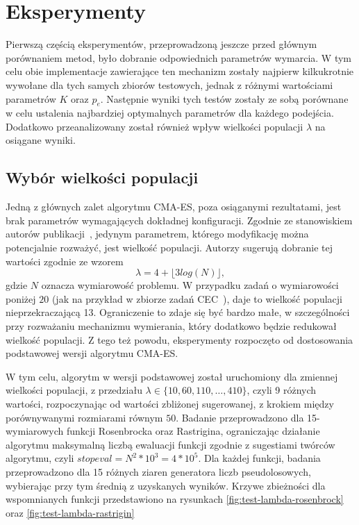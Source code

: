 \documentclass[10pt]{article}
\begin{document}
\section{Eksperymenty}
Pierwszą częścią eksperymentów, przeprowadzoną jeszcze przed głównym porównaniem metod, było dobranie odpowiednich parametrów wymarcia. W tym celu obie implementacje zawierające ten mechanizm zostały najpierw kilkukrotnie wywołane dla tych samych zbiorów testowych, jednak z różnymi wartościami parametrów $K$ oraz $p_e$. Następnie wyniki tych testów zostały ze sobą porównane w celu ustalenia najbardziej optymalnych parametrów dla każdego podejścia. Dodatkowo przeanalizowany został również wpływ wielkości populacji $\lambda$ na osiągane wyniki.

\subsection{Wybór wielkości populacji}
Jedną z głównych zalet algorytmu CMA-ES, poza osiąganymi rezultatami, jest brak parametrów wymagających dokładnej konfiguracji. Zgodnie ze stanowiskiem autorów publikacji~\cite{hansen2011}, jedynym parametrem, którego modyfikację można potencjalnie rozważyć, jest wielkość populacji. Autorzy sugerują dobranie tej wartości zgodnie ze wzorem $$\lambda = 4 + \lfloor3log(N)\rfloor,$$ gdzie $N$ oznacza wymiarowość problemu. W przypadku zadań o wymiarowości poniżej $20$ (jak na przykład w zbiorze zadań CEC~\cite{CEC}), daje to wielkość populacji nieprzekraczającą 13. Ograniczenie to zdaje się być bardzo małe, w szczególności przy rozważaniu mechanizmu wymierania, który dodatkowo będzie redukował wielkość populacji. Z tego też powodu, eksperymenty rozpoczęto od dostosowania podstawowej wersji algorytmu CMA-ES.

W tym celu, algorytm w wersji podstawowej został uruchomiony dla zmiennej wielkości populacji, z przedziału $\lambda \in \{10, 60, 110, \dots, 410\}$, czyli 9 różnych wartości, rozpoczynając od wartości zbliżonej sugerowanej, z krokiem między porównywanymi rozmiarami równym $50$. Badanie przeprowadzono dla 15-wymiarowych funkcji Rosenbrocka oraz Rastrigina, ograniczając działanie algorytmu maksymalną liczbą ewaluacji funkcji zgodnie z sugestiami twórców algorytmu, czyli $stopeval=N^2*10^3=4*10^5$. Dla każdej funkcji, badania przeprowadzono dla 15 różnych ziaren generatora liczb pseudolosowych, wybierając przy tym średnią z uzyskanych wyników. Krzywe zbieżności dla wspomnianych funkcji przedstawiono na rysunkach \ref{fig:test-lambda-rosenbrock} oraz \ref{fig:test-lambda-rastrigin}
\end{document}
